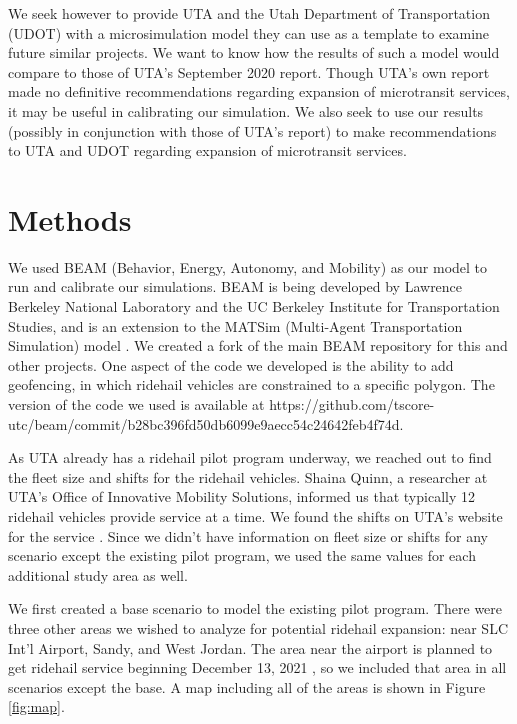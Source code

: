 \documentclass[3p, authoryear]{elsarticle} %
\begin{document}
We seek however to provide UTA and the Utah Department of Transportation (UDOT) with a microsimulation model they can use as a template to examine future similar projects.
We want to know how the results of such a model would compare to those of UTA's September 2020 report.
Though UTA's own report made no definitive recommendations regarding expansion of microtransit services, it may be useful in calibrating our simulation.
We also seek to use our results (possibly in conjunction with those of UTA's report) to make recommendations to UTA and UDOT regarding expansion of microtransit services.

\hypertarget{methods}{%
\section{Methods}\label{methods}}

We used BEAM (Behavior, Energy, Autonomy, and Mobility) as our model to run and calibrate our simulations. BEAM is being developed by Lawrence Berkeley National Laboratory and the UC Berkeley Institute for Transportation Studies, and is an extension to the MATSim (Multi-Agent Transportation Simulation) model \citep{beamdocs}. We created a fork of the main BEAM repository for this and other projects. One aspect of the code we developed is the ability to add geofencing, in which ridehail vehicles are constrained to a specific polygon. The version of the code we used is available at https://github.com/tscore-utc/beam/commit/b28bc396fd50db6099e9aecc54c24642feb4f74d.

As UTA already has a ridehail pilot program underway, we reached out to find the fleet size and shifts for the ridehail vehicles. Shaina Quinn, a researcher at UTA's Office of Innovative Mobility Solutions, informed us that typically 12 ridehail vehicles provide service at a time. We found the shifts on UTA's website for the service \citep{SLCSouth}. Since we didn't have information on fleet size or shifts for any scenario except the existing pilot program, we used the same values for each additional study area as well.

We first created a base scenario to model the existing pilot program. There were three other areas we wished to analyze for potential ridehail expansion: near SLC Int'l Airport, Sandy, and West Jordan. The area near the airport is planned to get ridehail service beginning December 13, 2021 \citep{Airport}, so we included that area in all scenarios except the base. A map including all of the areas is shown in Figure \ref{fig:map}.
\end{document}
